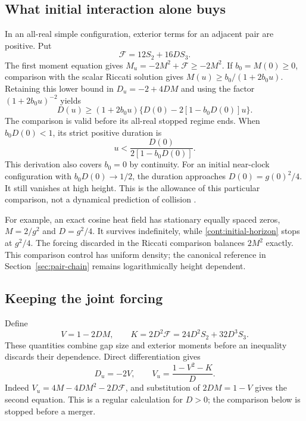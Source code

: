 \subsection{What initial interaction alone buys}

In an all-real simple configuration, exterior terms for an adjacent
pair are positive. Put
\begin{equation}
 \mathcal F=12S_2+16DS_3.
 \label{cont:F}
\end{equation}
The first moment equation gives
$M_u=-2M^2+\mathcal F\ge-2M^2$.
If $b_0=M(0)\ge0$, comparison with the scalar Riccati solution gives
$M(u)\ge b_0/(1+2b_0u)$. Retaining this lower bound in
$D_u=-2+4DM$ and using the factor $(1+2b_0u)^{-2}$ yields
\begin{equation}
 D(u)\ge(1+2b_0u)
       \{D(0)-2[1-b_0D(0)]u\}.
 \label{cont:initial-mass}
\end{equation}
The comparison is valid before its all-real stopped regime ends.
When $b_0D(0)<1$, its strict positive duration is
\begin{equation}
 u<\frac{D(0)}{2[1-b_0D(0)]}.
 \label{cont:initial-horizon}
\end{equation}
This derivation also covers $b_0=0$ by continuity. For an initial
near-clock configuration with $b_0D(0)\to1/2$, the duration approaches
$D(0)=g(0)^2/4$. It still vanishes at high height. This is the allowance
of this particular comparison, not a dynamical prediction of collision
\cite[\S\S13--15]{VCDCMManuscript}.

For example, an exact cosine heat field has stationary equally spaced
zeros, $M=2/g^2$ and $D=g^2/4$. It survives indefinitely, while
\eqref{cont:initial-horizon} stops at $g^2/4$. The forcing discarded
in the Riccati comparison balances $2M^2$ exactly. This comparison
control has uniform density; the canonical reference in
Section~\ref{sec:pair-chain} remains logarithmically height dependent.

\subsection{Keeping the joint forcing}

Define
\begin{equation}
 V=1-2DM,\qquad K=2D^2\mathcal F
                      =24D^2S_2+32D^3S_3.
 \label{cont:VK}
\end{equation}
These quantities combine gap size and exterior moments before an
inequality discards their dependence. Direct differentiation gives
\begin{equation}
 D_u=-2V,\qquad V_u=\frac{1-V^2-K}{D}.
 \label{cont:VK-law}
\end{equation}
Indeed $V_u=4M-4DM^2-2D\mathcal F$, and substitution of
$2DM=1-V$ gives the second equation. This is a regular calculation
for $D>0$; the comparison below is stopped before a merger.


